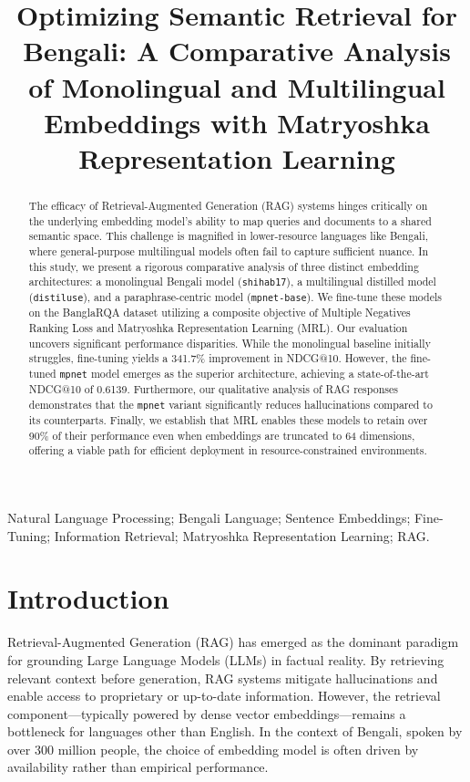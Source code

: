 \documentclass[10pt, conference, compsocconf]{IEEEtran}
\title{Optimizing Semantic Retrieval for Bengali: A Comparative Analysis of Monolingual and Multilingual Embeddings with Matryoshka Representation Learning}
\author{
    \IEEEauthorblockN{Your Name}
    \IEEEauthorblockA{Your Department\\
    Your University/Institution\\
    Your City, Country\\
    your.email@example.com}
    \and
    \IEEEauthorblockN{Co-author Name}
    \IEEEauthorblockA{Department\\
    Institution\\
    City, Country\\
    email@example.com}
}
\begin{document}
\maketitle

\begin{abstract}
The efficacy of Retrieval-Augmented Generation (RAG) systems hinges critically on the underlying embedding model's ability to map queries and documents to a shared semantic space. This challenge is magnified in lower-resource languages like Bengali, where general-purpose multilingual models often fail to capture sufficient nuance. In this study, we present a rigorous comparative analysis of three distinct embedding architectures: a monolingual Bengali model (\texttt{shihab17}), a multilingual distilled model (\texttt{distiluse}), and a paraphrase-centric model (\texttt{mpnet-base}). We fine-tune these models on the BanglaRQA dataset utilizing a composite objective of Multiple Negatives Ranking Loss and Matryoshka Representation Learning (MRL). Our evaluation uncovers significant performance disparities. While the monolingual baseline initially struggles, fine-tuning yields a 341.7\% improvement in NDCG@10. However, the fine-tuned \texttt{mpnet} model emerges as the superior architecture, achieving a state-of-the-art NDCG@10 of 0.6139. Furthermore, our qualitative analysis of RAG responses demonstrates that the \texttt{mpnet} variant significantly reduces hallucinations compared to its counterparts. Finally, we establish that MRL enables these models to retain over 90\% of their performance even when embeddings are truncated to 64 dimensions, offering a viable path for efficient deployment in resource-constrained environments.
\end{abstract}

\begin{IEEEkeywords}
Natural Language Processing; Bengali Language; Sentence Embeddings; Fine-Tuning; Information Retrieval; Matryoshka Representation Learning; RAG.
\end{IEEEkeywords}

\section{Introduction}

Retrieval-Augmented Generation (RAG) has emerged as the dominant paradigm for grounding Large Language Models (LLMs) in factual reality. By retrieving relevant context before generation, RAG systems mitigate hallucinations and enable access to proprietary or up-to-date information. However, the retrieval component—typically powered by dense vector embeddings—remains a bottleneck for languages other than English. In the context of Bengali, spoken by over 300 million people, the choice of embedding model is often driven by availability rather than empirical performance.
\end{document}
